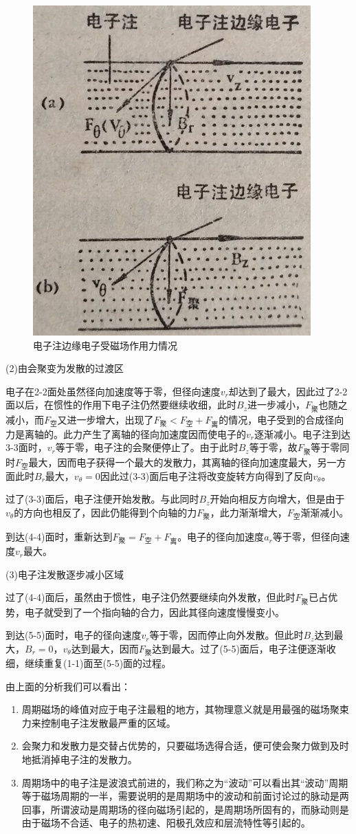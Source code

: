 \begin{figure}[phtb]
	\centering
	\includegraphics[width=0.25\linewidth]{figure/ch7-20}
	\caption{电子注边缘电子受磁场作用力情况}
	\label{ch7-20}
\end{figure}

(2)由会聚变为发散的过渡区


电子在2-2面处虽然径向加速度等于零，但径向速度$ v_r $却达到了最大，因此过了2-2面以后，在惯性的作用下电子注仍然要继续收细，此时$ B_z $进一步减小，$ F_{\textrm{聚}}$也随之减小，而$ F_{\textrm{空}}$又进一步增大，出现了$ F_{\textrm{聚}} <  F_{\textrm{空}} +  F_{\textrm{离}}  $的情况，电子受到的合成径向力是离轴的。此力产生了离轴的径向加速度因而使电子的$ v_r $逐渐减小。电子注到达3-3面时，$ v_r $等于零，电子注的会聚便停止了。由于此时$ B_z $等于零，故$ F_{\textrm{聚}}$等于零同时$ F_{\textrm{空}}$最大，因而电子获得一个最大的发散力，其离轴的径向加速度最大，另一方面此时$ B_r $最大，$ v_\theta=0 $因此过(3-3)面后电子注将改变旋转方向得到了反向$ v_\theta $。


过了(3-3)面后，电子注便开始发散。与此同时$ B_z $开始向相反方向增大，但是由于$ v_\theta $的方向也相反了，因此仍能得到个向轴的力$ F_{\textrm{聚}}$，此力渐渐增大，$ F_{\textrm{空}}$渐渐减小。


到达(4-4)面时，重新达到$ F_{\textrm{聚}} =  F_{\textrm{空}} +  F_{\textrm{离}}  $。电子的径向加速度$ a_r $等于零，但径向速度$ v_r $最大。


(3)电子注发散逐步减小区域


过了(4-4)面后，虽然由于惯性，电子注仍然要继续向外发散，但此时$ F_{\textrm{聚}}$已占优势，电子就受到了一个指向轴的合力，因此其径向速度慢慢变小。


到达(5-5)面时，电子的径向速度$ v_r $等于零，因而停止向外发散。但此时$ B_z $达到最大，$ B_r=0 $，$ v_\theta $达到最大，因而$ F_{\textrm{聚}}$达到最大。过了(5-5)面后，电子注便逐渐收细，继续重复(1-1)面至(5-5)面的过程。


由上面的分析我们可以看出：

\begin{enumerate}
	\item 周期磁场的峰值对应于电子注最粗的地方，其物理意义就是用最强的磁场聚束力来控制电子注发散最严重的区域。
	\item 会聚力和发散力是交替占优势的，只要磁场选得合适，便可使会聚力做到及时地抵消掉电子注的发散力。
	\item 周期场中的电子注是波浪式前进的，我们称之为“波动”可以看出其“波动”周期等于磁场周期的一半，需要说明的是周期场中的波动和前面讨论过的脉动是两回事，所谓波动是周期场的径向磁场引起的，是周期场所固有的，而脉动则是由于磁场不合适、电子的热初速、阳极孔效应和层流特性等引起的。
\end{enumerate}

